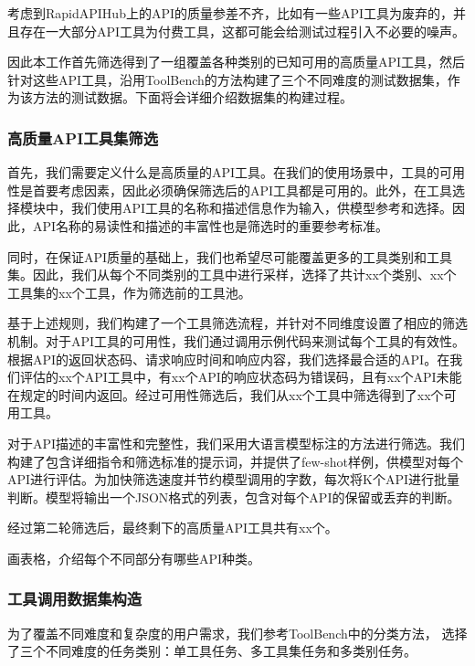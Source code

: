 考虑到RapidAPIHub上的API的质量参差不齐，比如有一些API工具为废弃的，并且存在一大部分API工具为付费工具，这都可能会给测试过程引入不必要的噪声。

因此本工作首先筛选得到了一组覆盖各种类别的已知可用的高质量API工具，然后针对这些API工具，沿用ToolBench的方法构建了三个不同难度的测试数据集，作为该方法的测试数据。下面将会详细介绍数据集的构建过程。

\subsubsection{高质量API工具集筛选}

首先，我们需要定义什么是高质量的API工具。在我们的使用场景中，工具的可用性是首要考虑因素，因此必须确保筛选后的API工具都是可用的。此外，在工具选择模块中，我们使用API工具的名称和描述信息作为输入，供模型参考和选择。因此，API名称的易读性和描述的丰富性也是筛选时的重要参考标准。

同时，在保证API质量的基础上，我们也希望尽可能覆盖更多的工具类别和工具集。因此，我们从每个不同类别的工具中进行采样，选择了共计xx个类别、xx个工具集的xx个工具，作为筛选前的工具池。

基于上述规则，我们构建了一个工具筛选流程，并针对不同维度设置了相应的筛选机制。对于API工具的可用性，我们通过调用示例代码来测试每个工具的有效性。根据API的返回状态码、请求响应时间和响应内容，我们选择最合适的API。在我们评估的xx个API工具中，有xx个API的响应状态码为错误码，且有xx个API未能在规定的时间内返回。经过可用性筛选后，我们从xx个工具中筛选得到了xx个可用工具。

对于API描述的丰富性和完整性，我们采用大语言模型标注的方法进行筛选。我们构建了包含详细指令和筛选标准的提示词，并提供了few-shot样例，供模型对每个API进行评估。为加快筛选速度并节约模型调用的字数，每次将K个API进行批量判断。模型将输出一个JSON格式的列表，包含对每个API的保留或丢弃的判断。

经过第二轮筛选后，最终剩下的高质量API工具共有xx个。

画表格，介绍每个不同部分有哪些API种类。

\subsubsection{工具调用数据集构造}

为了覆盖不同难度和复杂度的用户需求，我们参考ToolBench中的分类方法，
选择了三个不同难度的任务类别：单工具任务、多工具集任务和多类别任务。

